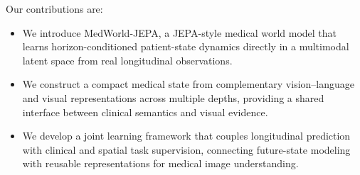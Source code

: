 Our contributions are:
\begin{itemize}
    \item We introduce MedWorld-JEPA, a JEPA-style medical world model that learns horizon-conditioned patient-state dynamics directly in a multimodal latent space from real longitudinal observations.
    \item We construct a compact medical state from complementary vision--language and visual representations across multiple depths, providing a shared interface between clinical semantics and visual evidence.
    \item We develop a joint learning framework that couples longitudinal prediction with clinical and spatial task supervision, connecting future-state modeling with reusable representations for medical image understanding.
\end{itemize}
